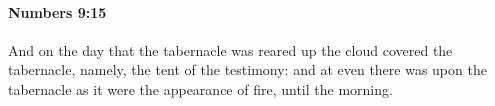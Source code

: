 
		\paragraph{Numbers 9:15} %
			\label{NUMBERS-9-15}

			And on the day that the tabernacle was reared up the cloud covered the tabernacle, namely, the tent of the testimony: and at even there was upon the tabernacle as it were the appearance of fire, until the morning.


